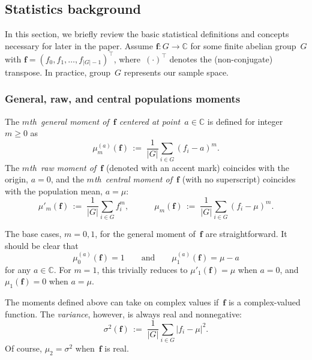 \documentclass[letterpaper,11pt]{article}
\newcommand{\bs}[1]{{\boldsymbol{#1}}}
\newcommand{\gr}[1]{( #1 )}
\newcommand{\abs}[1]{\vert #1 \vert}
\newcommand{\C}{\mathbb C}
\newcommand{\dimin}[2]{{ #1 }^{\gr{#2}}}
\newcommand{\mth}{$m$th}
\theoremstyle{definition} \newtheorem{remark}{Remark}
\begin{document}
\subsection{Statistics background}
In this section, we briefly review the basic statistical definitions and concepts necessary for later in the paper. Assume $\bs{f}: G\rightarrow\C$ for some finite abelian group~$G$ with $\bs{f} = \gr{f_0,f_1,\ldots,f_{\abs{G}-1}}^\top$, where~$\gr{\cdot}^\top$ denotes the (non-conjugate) transpose. In practice, group~$G$ represents our sample space.


\subsubsection{General, raw, and central populations moments} \label{Sec:Gen_raw_central_momennts}
The \emph{\mth\ general moment of~$\bs{f}$ centered at point~$a\in\C$} is defined for integer $m\geq0$ as
\begin{equation} \label{Def:mthMoment_a}
\dimin{\mu}{a}_m\gr{\bs{f}} \,:=\; \frac{1}{\abs{G}} \sum_{i\in G} \gr{f_i-a}^m.
\end{equation}
The \emph{\mth\ raw moment of~$\bs{f}$} (denoted with an accent mark) coincides with the origin, $a=0$, and the \emph{\mth\ central moment of~$\bs{f}$} (with no superscript) coincides with the population mean, $a=\mu$:
\begin{equation} \label{Def:mthRawCentralMoments}
\mu'_m\gr{\bs{f}} \,:=\; \frac{1}{\abs{G}} \sum_{i\in G} f_i^m, \quad\qquad
\mu_m\gr{\bs{f}} \,:=\; \frac{1}{\abs{G}} \sum_{i\in G} \gr{f_i-\mu}^m.
\end{equation}

The base cases, $m=0,1$, for the general moment of~$\bs{f}$ are straightforward. It should be clear that
\begin{equation} \label{Eq:mthMoment_base_cases}
\dimin{\mu}{a}_0\gr{\bs{f}} = 1 \qquad\text{and}\qquad \dimin{\mu}{a}_1\gr{\bs{f}} = \mu-a
\end{equation}
for any $a\in\C$.
For $m=1$, this trivially reduces to $\mu'_1\gr{\bs{f}} = \mu$ when $a=0$, and $\mu_1\gr{\bs{f}} = 0$ when $a=\mu$.

The moments defined above can take on complex values if~$\bs{f}$ is a complex-valued function. The \emph{variance}, however, is always real and nonnegative:
\begin{equation} \label{Def:Variance}
\sigma^2\gr{\bs{f}} \,:=\; \frac{1}{\abs{G}} \sum_{i\in G} \abs{f_i-\mu}^2.
\end{equation}
Of course, $\mu_2 = \sigma^2$ when~$\bs{f}$ is real.
\end{document}
